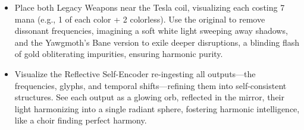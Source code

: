 \begin{itemize}
\begin{itemize}
        \item \texttt{} Place both Legacy Weapons near the Tesla coil, visualizing each costing 7 mana (e.g., 1 of each color + 2 colorless). Use the original to remove dissonant frequencies, imagining a soft white light sweeping away shadows, and the Yawgmoth's Bane version to exile deeper disruptions, a blinding flash of gold obliterating impurities, ensuring harmonic purity.
        \item \texttt{} Visualize the Reflective Self-Encoder re-ingesting all outputs—the frequencies, glyphs, and temporal shifts—refining them into self-consistent structures. See each output as a glowing orb, reflected in the mirror, their light harmonizing into a single radiant sphere, fostering harmonic intelligence, like a choir finding perfect harmony.
    \end{itemize}
\end{itemize}


